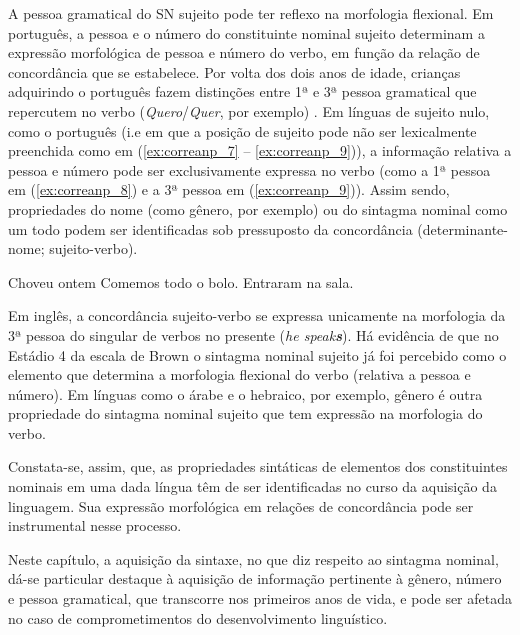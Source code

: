 \documentclass[output=paper]{LSP/langsci}
\begin{document}
A pessoa gramatical do SN sujeito pode ter reflexo na morfologia flexional. Em português, a pessoa e o número do constituinte nominal sujeito determinam a expressão morfológica de pessoa e número do verbo, em função da relação de concordância que se estabelece. Por volta dos dois anos de idade, crianças adquirindo o português fazem distinções entre 1ª e 3ª pessoa gramatical que repercutem no verbo (\textit{Quero}/\textit{Quer}, por exemplo) \citep{martins2007}. Em línguas de sujeito nulo, como o português (i.e em que a posição de sujeito pode não ser lexicalmente preenchida como em (\ref{ex:correanp_7} – \ref{ex:correanp_9})), a informação relativa a pessoa e número pode ser exclusivamente expressa no verbo  (como a 1ª pessoa em (\ref{ex:correanp_8}) e a 3ª pessoa em (\ref{ex:correanp_9})). Assim sendo, propriedades do nome (como gênero, por exemplo) ou do sintagma nominal como um todo podem ser identificadas sob pressuposto da concordância (determinante-nome; sujeito-verbo). 

\ea\label{ex:correanp_7}
Choveu ontem
\z
\ea\label{ex:correanp_8}
Comemos todo o bolo.
\z
\ea\label{ex:correanp_9}
Entraram na sala.
\z

Em inglês, a concordância sujeito-verbo se expressa unicamente na morfologia da 3ª pessoa do singular de verbos no presente (\textit{he speak\textbf{s}}). Há evidência de que no Estádio 4 da escala de Brown o sintagma nominal sujeito já foi percebido como o elemento que determina a morfologia flexional do verbo (relativa a pessoa e número). Em línguas como o árabe e o hebraico, por exemplo, gênero é outra propriedade do sintagma nominal sujeito que tem expressão na morfologia do verbo. 

Constata-se, assim, que, as propriedades sintáticas de elementos dos constituintes nominais em uma dada língua têm de ser identificadas no curso da aquisição da linguagem. Sua expressão morfológica em relações de concordância pode ser instrumental nesse processo. 

Neste capítulo, a aquisição da sintaxe, no que diz respeito ao sintagma nominal, dá-se particular destaque à aquisição de informação pertinente à gênero, número e pessoa gramatical, que transcorre nos primeiros anos de vida, e pode ser afetada no caso de comprometimentos do desenvolvimento linguístico.  
\end{document}
